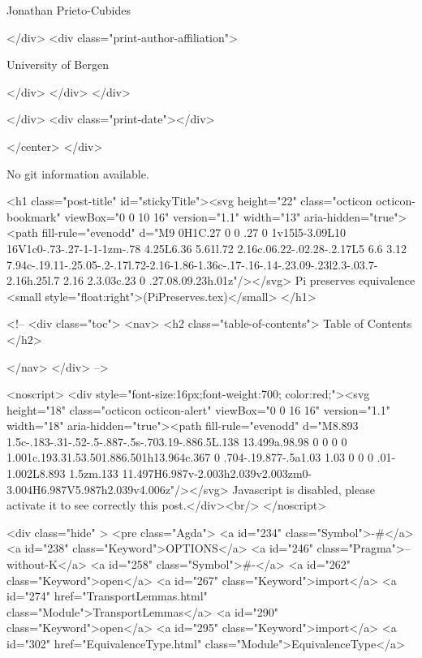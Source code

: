                   Jonathan Prieto-Cubides
                
              </div>
              <div class="print-author-affiliation">
                
                  University of Bergen
                
                </div>
            </div>
          </div>
          
          
        </div>
        <div class="print-date"></div>
        
        
    </center>
  </div>

  
  No git information available.
  

  <h1 class="post-title" id="stickyTitle"><svg height="22" class="octicon octicon-bookmark" viewBox="0 0 10 16" version="1.1" width="13" aria-hidden="true"><path fill-rule="evenodd" d="M9 0H1C.27 0 0 .27 0 1v15l5-3.09L10 16V1c0-.73-.27-1-1-1zm-.78 4.25L6.36 5.61l.72 2.16c.06.22-.02.28-.2.17L5 6.6 3.12 7.94c-.19.11-.25.05-.2-.17l.72-2.16-1.86-1.36c-.17-.16-.14-.23.09-.23l2.3-.03.7-2.16h.25l.7 2.16 2.3.03c.23 0 .27.08.09.23h.01z"/></svg> Pi preserves equivalence <small style="float:right">(PiPreserves.tex)</small>
  </h1>

  <!-- 
  <div class="toc">
    <nav>
    <h2 class="table-of-contents"> Table of Contents </h2>
      

    </nav>
  </div>
   -->

  <noscript>
  <div style="font-size:16px;font-weight:700; color:red;"><svg height="18" class="octicon octicon-alert" viewBox="0 0 16 16" version="1.1" width="18" aria-hidden="true"><path fill-rule="evenodd" d="M8.893 1.5c-.183-.31-.52-.5-.887-.5s-.703.19-.886.5L.138 13.499a.98.98 0 0 0 0 1.001c.193.31.53.501.886.501h13.964c.367 0 .704-.19.877-.5a1.03 1.03 0 0 0 .01-1.002L8.893 1.5zm.133 11.497H6.987v-2.003h2.039v2.003zm0-3.004H6.987V5.987h2.039v4.006z"/></svg> Javascript is disabled, please activate it to see correctly this post.</div><br/>
  </noscript>

  <div class="hide" >
<pre class="Agda">
<a id="234" class="Symbol">{-#</a> <a id="238" class="Keyword">OPTIONS</a> <a id="246" class="Pragma">--without-K</a> <a id="258" class="Symbol">#-}</a>
<a id="262" class="Keyword">open</a> <a id="267" class="Keyword">import</a> <a id="274" href="TransportLemmas.html" class="Module">TransportLemmas</a>
<a id="290" class="Keyword">open</a> <a id="295" class="Keyword">import</a> <a id="302" href="EquivalenceType.html" class="Module">EquivalenceType</a>

